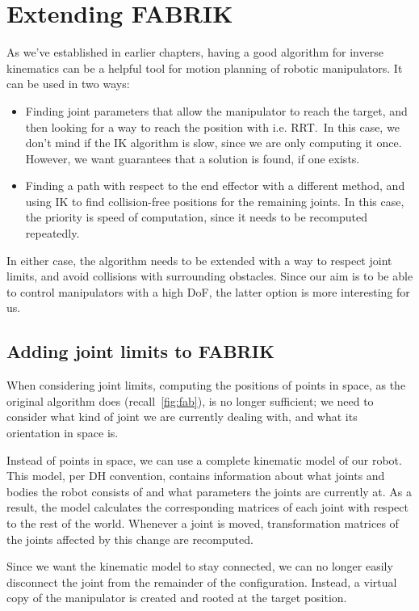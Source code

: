 \chapter{Extending FABRIK}

As we've established in earlier chapters, having a good algorithm for inverse kinematics can be a helpful tool for motion planning of robotic manipulators. It can be used in two ways:

\begin{itemize}
  \item Finding joint parameters that allow the manipulator to reach the target, and then looking for a way to reach the position with i.e. RRT.\ In this case, we don't mind if the IK algorithm is slow, since we are only computing it once. However, we want guarantees that a solution is found, if one exists.
  \item Finding a path with respect to the end effector with a different method, and using IK to find collision-free positions for the remaining joints. In this case, the priority is speed of computation, since it needs to be recomputed repeatedly.
\end{itemize}

In either case, the algorithm needs to be extended with a way to respect joint limits, and avoid collisions with surrounding obstacles. Since our aim is to be able to control manipulators with a high DoF, the latter option is more interesting for us.

\section{Adding joint limits to FABRIK}

When considering joint limits, computing the positions of points in space, as the original algorithm does (recall~\ref{fig:fab}), is no longer sufficient; we need to consider what kind of joint we are currently dealing with, and what its orientation in space is.

Instead of points in space, we can use a complete kinematic model of our robot. This model, per DH convention, contains information about what joints and bodies the robot consists of and what parameters the joints are currently at. As a result, the model calculates the corresponding matrices of each joint with respect to the rest of the world. Whenever a joint is moved, transformation matrices of the joints affected by this change are recomputed.

Since we want the kinematic model to stay connected, we can no longer easily disconnect the joint from the remainder of the configuration. Instead, a virtual copy of the manipulator is created and rooted at the target position.

